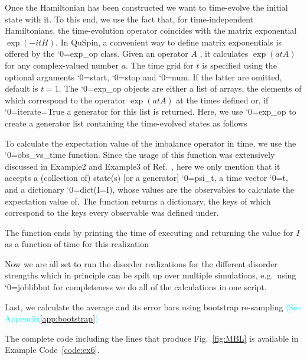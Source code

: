 \documentclass{SciPost}
\newcommand\0{\scalebox{-1}[1]{0}}
\let\svttfamily\ttfamily
\renewcommand\ttfamily{\svttfamily\catcode`0=\active }
\renewcommand\texttt{\bgroup\ttfamily\texttthelp}
\def\texttthelp#1{#1\egroup}
\newcommand*{\cyan}{\textcolor{cyan}}
\newcommand{\MBLcode}{example6.py}
\begin{document}
Once the Hamiltonian has been constructed we want to time-evolve the initial state with it. To this end, we use the fact that, for time-independent Hamiltonians, the time-evolution operator coincides with the matrix exponential $\exp(-itH)$. In QuSpin, a convenient way to define matrix exponentials is offered by the \texttt{exp\_op} class. Given an operator $A$ , it calculates $\exp(atA)$ for any complex-valued number $a$. The time grid for $t$ is specified using the optional arguments \texttt{start}, \texttt{stop} and \texttt{num}. If the latter are omitted, default is $t=1$. The \texttt{exp\_op} objects are either a list of arrays, the elements of which correspond to the operator $\exp(atA)$ at the times defined or, if \texttt{iterate=True} a generator for this list is returned. Here, we use \texttt{exp\_op} to create a generator list containing the time-evolved states as follows


To calculate the expectation value of the imbalance operator in time, we use the \texttt{obs\_vs\_time} function. Since the usage of this function was extensively discussed in Example2 and Example3 of Ref.~\cite{weinberg_17_quspin}, here we only mention that it accepts a (collection of) state(s) [or a generator] \texttt{psi\_t}, a time vector \texttt{t}, and a dictionary \texttt{dict(I=I)}, whose values are the observables to calculate the expectation value of. The function returns a dictionary, the keys of which correspond to the keys every observable was defined under.


The function ends by printing the time of executing and returning the value for $I$ as a function of time for this realization


Now we are all set to run the disorder realizations for the different disorder strengths which in principle can be spilt up over multiple simulations, e.g.~using \texttt{joblib} [c.f.~Example2 from Ref.~\cite{weinberg_17_quspin}] but for completeness we do all of the calculations in one script. 

Last, we calculate the average and its error bars using bootstrap re-sampling \cyan{(See Appendix\ref{app:bootstrap})}


The complete code including the lines that produce Fig.~\ref{fig:MBL} is available in Example Code~\ref{code:ex6}.
\end{document}

